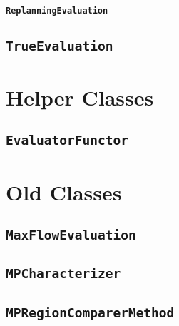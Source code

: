\paragraph{\texttt{ReplanningEvaluation}}

\subsection{\texttt{TrueEvaluation}}

\section{Helper Classes}

\subsection{\texttt{EvaluatorFunctor}}

\section{Old Classes}

\subsection{\texttt{MaxFlowEvaluation}}

\subsection{\texttt{MPCharacterizer}}

\subsection{\texttt{MPRegionComparerMethod}}

